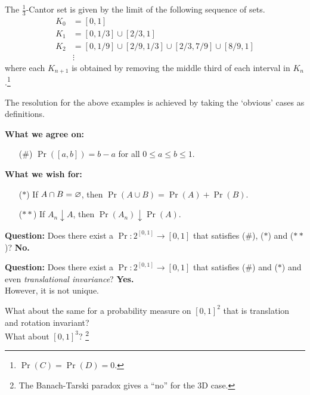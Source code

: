 \begin{examples}
    The $\frac13$-Cantor set is given by the limit of the following
    sequence of sets. \begin{align*}
        K_0 &= [0, 1] \\
        K_1 &= [0, 1/3] \cup [2/3, 1] \\
        K_2 &= [0, 1/9] \cup [2/9, 1/3] \cup [2/3, 7/9] \cup [8/9, 1] \\
        &\vdots
    \end{align*}
    where each $K_{n+1}$ is obtained by removing the middle third of each
    interval in $K_n$.\footnote{$\Pr(C) = \Pr(D) = 0$.}
\end{examples}

The resolution for the above examples is achieved by taking the `obvious'
cases as definitions.

\vspace{2em}
\begin{minipage}{0.4\textwidth}
    \textbf{What we agree on:}
    \begin{itemize}
        \item[(\#)] $\Pr([a, b]) = b - a$ for all $0 \le a \le b \le 1$.
    \end{itemize}
\end{minipage}%
\quad%
\begin{minipage}{0.5\textwidth}
    \textbf{What we wish for:}
    \begin{itemize}
        \item[($*$)] If $A \cap B = \varnothing$, then
            $\Pr(A \cup B) = \Pr(A) + \Pr(B)$.
        \item[($**$)] If $A_n \downarrow A$, then
            $\Pr(A_n) \downarrow \Pr(A)$.
    \end{itemize}
\end{minipage}

\vspace{1em}
\textbf{Question:} Does there exist a $\Pr\colon 2^{[0, 1]} \to [0, 1]$
that satisfies (\#), ($*$) and ($**$)?
\textbf{No.}

\textbf{Question:} Does there exist a $\Pr\colon 2^{[0, 1]} \to [0, 1]$
that satisfies (\#) and ($*$) and even \emph{translational invariance}?
\textbf{Yes.} \\
However, it is not unique.

What about the same for a probability measure on $[0, 1]^2$ that is
translation and rotation invariant? \\
What about $[0, 1]^3$?%
\footnote{The Banach-Tarski paradox gives a ``no'' for the 3D case.}

